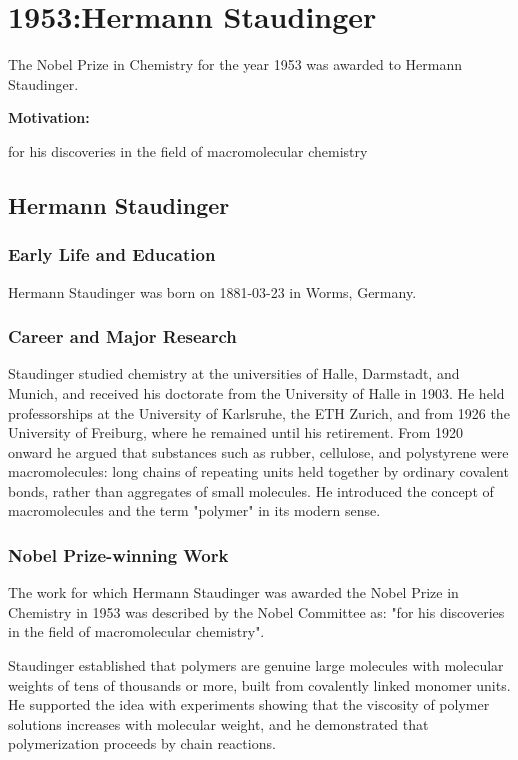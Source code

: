 \chapter{1953:Hermann Staudinger}

\label{chap:chemistry1953}

The Nobel Prize in Chemistry for the year 1953 was awarded to Hermann Staudinger.

\textbf{Motivation:}

for his discoveries in the field of macromolecular chemistry

\section{Hermann Staudinger}

\subsection*{Early Life and Education}

Hermann Staudinger was born on 1881-03-23 in Worms, Germany.

\subsection*{Career and Major Research}

Staudinger studied chemistry at the universities of Halle, Darmstadt, and Munich, and received his doctorate from the University of Halle in 1903. He held professorships at the University of Karlsruhe, the ETH Zurich, and from 1926 the University of Freiburg, where he remained until his retirement. From 1920 onward he argued that substances such as rubber, cellulose, and polystyrene were macromolecules: long chains of repeating units held together by ordinary covalent bonds, rather than aggregates of small molecules. He introduced the concept of macromolecules and the term "polymer" in its modern sense.

\subsection*{Nobel Prize-winning Work}

The work for which Hermann Staudinger was awarded the Nobel Prize in Chemistry in 1953 was described by the Nobel Committee as: "for his discoveries in the field of macromolecular chemistry".

Staudinger established that polymers are genuine large molecules with molecular weights of tens of thousands or more, built from covalently linked monomer units. He supported the idea with experiments showing that the viscosity of polymer solutions increases with molecular weight, and he demonstrated that polymerization proceeds by chain reactions.

